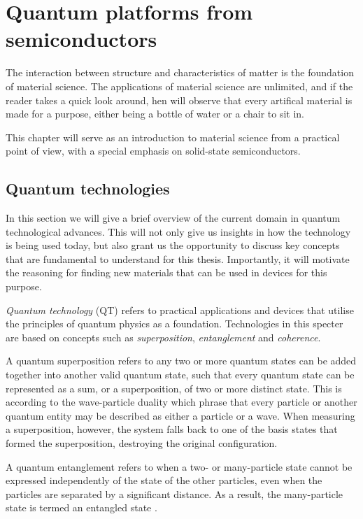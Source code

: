 \chapter{Quantum platforms from semiconductors}

The interaction between structure and characteristics of matter is the foundation of material science. The applications of material science are unlimited, and if the reader takes a quick look around, hen will observe that every artifical material is made for a purpose, either being a bottle of water or a chair to sit in.

This chapter will serve as an introduction to material science from a practical point of view, with a special emphasis on solid-state semiconductors.


\section{Quantum technologies}

In this section we will give a brief overview of the current domain in quantum technological advances. This will not only give us insights in how the technology is being used today, but also grant us the opportunity to discuss key concepts that are fundamental to understand for this thesis. Importantly, it will motivate the reasoning for finding new materials that can be used in devices for this purpose.

\textit{Quantum technology} (QT) refers to practical applications and devices that utilise the principles of quantum physics as a foundation. Technologies in this specter are based on concepts such as \textit{superposition}, \textit{entanglement} and \textit{coherence}.

A quantum superposition refers to any two or more quantum states can be added together into another valid quantum state, such that every quantum state can be represented as a sum, or a superposition, of two or more distinct state. This is according to the wave-particle duality which phrase that every particle or another quantum entity may be described as either a particle or a wave. When measuring a superposition, however, the system falls back to one of the basis states that formed the superposition, destroying the original configuration.

A quantum entanglement refers to when a two- or many-particle state cannot be expressed independently of the state of the other particles, even when the particles are separated by a significant distance. As a result, the many-particle state is termed an entangled state \cite{Griffiths2017}.

